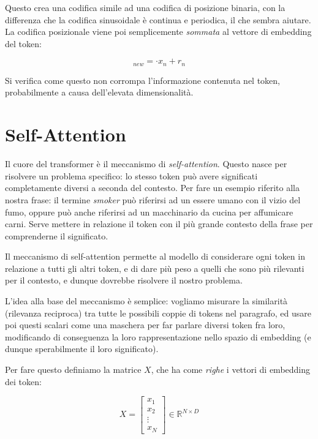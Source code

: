 Questo crea una codifica simile ad una codifica di posizione binaria, con la differenza che la codifica sinusoidale è continua e periodica, il che sembra aiutare. La codifica posizionale viene poi semplicemente \textit{sommata} al vettore di embedding del token:

\begin{equation}
    [x_n]_{new} = \cdot x_n + r_n
\end{equation}

Si verifica come questo non corrompa l'informazione contenuta nel token, probabilmente a causa dell'elevata dimensionalità.

\section{Self-Attention}

Il cuore del transformer è il meccanismo di \textit{self-attention}. Questo nasce per risolvere un problema specifico: lo stesso token può avere significati completamente diversi a seconda del contesto. Per fare un esempio riferito alla nostra frase: il termine \textit{smoker} può riferirsi ad un essere umano con il vizio del fumo, oppure può anche riferirsi ad un macchinario da cucina per affumicare carni. Serve mettere in relazione il token con il più grande contesto della frase per comprenderne il significato.

Il meccanismo di self-attention permette al modello di considerare ogni token in relazione a tutti gli altri token, e di dare più peso a quelli che sono più rilevanti per il contesto, e dunque dovrebbe risolvere il nostro problema.

L'idea alla base del meccanismo è semplice: vogliamo misurare la similarità (rilevanza reciproca) tra tutte le possibili coppie di tokens nel paragrafo, ed usare poi questi scalari come una maschera per far parlare diversi token fra loro, modificando di conseguenza la loro rappresentazione nello spazio di embedding (e dunque sperabilmente il loro significato).

Per fare questo definiamo la matrice \(X\), che ha come \textit{righe} i vettori di embedding dei token:

\begin{equation}
    X = \begin{bmatrix}x_1\\x_2\\\vdots\\x_N\end{bmatrix} \in \mathbb{R}^{N \times D}
\end{equation}

